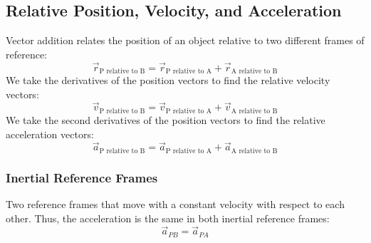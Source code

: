 \documentclass[article, 11pt]{article}
\theoremstyle{definition}
\begin{document}
    \subsection{Relative Position, Velocity, and Acceleration}
    Vector addition relates the position of an object relative to two different frames of reference:
    \begin{equation}
        \vec{r}_{\text{P relative to B}} = \vec{r}_{\text{P relative to A}} + \vec{r}_{\text{A relative to B}}
    \end{equation}
    We take the derivatives of the position vectors to find the relative velocity vectors:
    \begin{equation}
        \vec{v}_{\text{P relative to B}} = \vec{v}_{\text{P relative to A}} + \vec{v}_{\text{A relative to B}}
    \end{equation}
    We take the second derivatives of the position vectors to find the relative acceleration vectors:
    \begin{equation}
        \vec{a}_{\text{P relative to B}} = \vec{a}_{\text{P relative to A}} + \vec{a}_{\text{A relative to B}}
    \end{equation}
    \subsubsection{Inertial Reference Frames}
    Two reference frames that move with a constant velocity with respect to each other. Thus, the acceleration is the same in both inertial reference frames:
    \begin{equation}
        \vec{a}_{PB} = \vec{a}_{PA}
    \end{equation}
\end{document}
